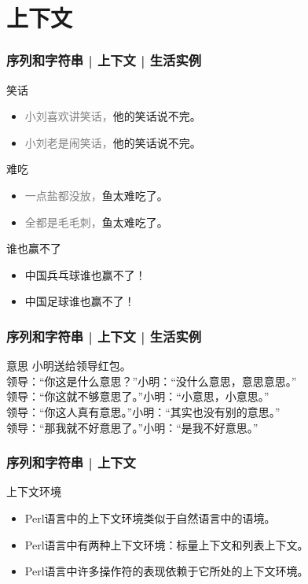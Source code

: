 \section{上下文}
\begin{frame}
  \frametitle{序列和字符串 | 上下文 | 生活实例}
  \begin{block}{笑话}
    \begin{itemize}
      \item \textcolor{gray}{小刘喜欢讲笑话，}他的笑话说不完。
      \item \textcolor{gray}{小刘老是闹笑话，}他的笑话说不完。
    \end{itemize}
  \end{block}
  \pause
  \begin{block}{难吃}
    \begin{itemize}
      \item \textcolor{gray}{一点盐都没放，}鱼太难吃了。
      \item \textcolor{gray}{全都是毛毛刺，}鱼太难吃了。
    \end{itemize}
  \end{block}
  \pause
  \begin{block}{谁也赢不了}
    \begin{itemize}
      \item 中国兵乓球谁也赢不了！
      \item 中国足球谁也赢不了！
    \end{itemize}
  \end{block}
\end{frame}

\begin{frame}
  \frametitle{序列和字符串 | 上下文 | 生活实例}
  \begin{block}{意思}
小明送给领导红包。\\
领导：“你这是什么意思？”\qquad 小明：“没什么意思，意思意思。”\\
领导：“你这就不够意思了。”\quad 小明：“小意思，小意思。”\\
领导：“你这人真有意思。”\qquad 小明：“其实也没有别的意思。”\\
领导：“那我就不好意思了。”\quad 小明：“是我不好意思。”
  \end{block}
\end{frame}

\begin{frame}
  \frametitle{序列和字符串 | 上下文}
  \begin{block}{上下文环境}
    \begin{itemize}
      \item Perl语言中的上下文环境类似于自然语言中的语境。
      \item Perl语言中有两种上下文环境：标量上下文和列表上下文。
      \item Perl语言中许多操作符的表现依赖于它所处的上下文环境。
    \end{itemize}
  \end{block}
\end{frame}

